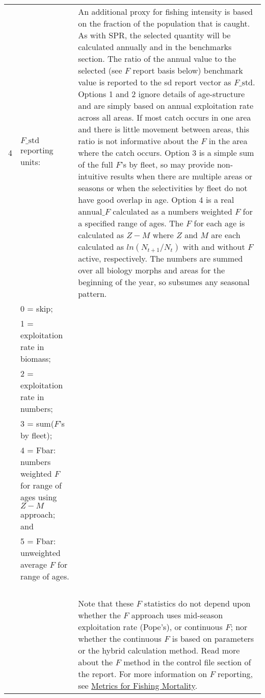 {\begin{landscape}
\begin{longtable}{p{1.5cm} p{7.2cm} p{12.3cm}}
\hline 
 4 & $F\text{\_std}$ reporting units: & \multirow{1}{12.3cm}[-0.25cm]{\parbox{12.3cm}{An additional proxy for fishing intensity is based on the fraction of the population that is caught. As with SPR, the selected quantity will be calculated annually and in the benchmarks section. The ratio of the annual value to the selected (see $F$ report basis below) benchmark value is reported to the \gls{sd} report vector as $F\text{\_std}$. Options 1 and 2 ignore details of age-structure and are simply based on annual exploitation rate across all areas. If most catch occurs in one area and there is little movement between areas, this ratio is not informative about the $F$ in the area where the catch occurs. Option 3 is a simple sum of the full $F$'s by fleet, so may provide non-intuitive results when there are multiple areas or seasons or when the selectivities by fleet do not have good overlap in age. Option 4 is a real $\text{annual\_}F$ calculated as a numbers weighted $F$ for a specified range of ages. The $F$ for each age is calculated as $Z-M$ where $Z$ and $M$ are each calculated as $ln(N_{t+1}/N_{t})$ with and without $F$ active, respectively. The numbers are summed over all biology morphs and areas for the beginning of the year, so subsumes any seasonal pattern.}} \Tstrut\Bstrut\\
   & 0 = skip; & \\
   & 1 = exploitation rate in biomass; & \\
   & 2 = exploitation rate in numbers; & \\
   & 3 = sum($F$'s by fleet); & \\
   & 4 = Fbar: numbers weighted $F$ for range of ages using $Z-M$ approach; and & \\
   & 5 = Fbar: unweighted average $F$ for range of ages. & \\
   & & \\
   & & \Bstrut\\
   & & \Bstrut\\
   & & \Bstrut\\
   & & Note that these $F$ statistics do not depend upon whether the $F$ approach uses mid-season exploitation rate (Pope's), or continuous $F$; nor whether the continuous $F$ is based on parameters or the hybrid calculation method. Read more about the $F$ method in the control file section of the report. For more information on $F$ reporting, see \hyperlink{FMortality}{Metrics for Fishing Mortality}. \Bstrut\\ 
  

\end{longtable}
\end{landscape}}
